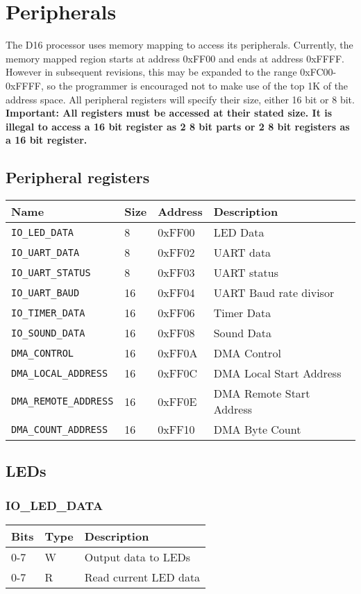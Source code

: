 \documentclass{article}
\newcommand{\regdesc}[2]{
  \subsubsection{#1}
  \begin{tabular}{|l|l|l|}
    \hline
    Bits & Type & Description \\ \hline
    #2
  \end{tabular}
}
\begin{document}
        \section{Peripherals}
        The D16 processor uses memory mapping to access its peripherals. Currently, the memory mapped region starts at address 0xFF00 and ends at address 0xFFFF. However in subsequent revisions, this may be expanded to the range 0xFC00-0xFFFF, so the programmer is encouraged not to make use of the top 1K of the address space.
        All peripheral registers will specify their size, either 16 bit or 8 bit. \textbf{Important: All registers must be accessed at their stated size. It is illegal to access a 16 bit register as 2 8 bit parts or 2 8 bit registers as a 16 bit register.}
        \subsection{Peripheral registers}
                \begin{tabular}{|l|l|l|l|}
        \hline
        Name & Size & Address & Description \\ \hline
        \verb|IO_LED_DATA| & 8 &0xFF00 & LED Data \\ \hline
        \verb|IO_UART_DATA| & 8 &0xFF02 & UART data \\ \hline
        \verb|IO_UART_STATUS| & 8 & 0xFF03 & UART status \\ \hline
        \verb|IO_UART_BAUD| & 16 & 0xFF04 & UART Baud rate divisor \\ \hline
        \verb|IO_TIMER_DATA| & 16 & 0xFF06 & Timer Data \\ \hline
        \verb|IO_SOUND_DATA| & 16 & 0xFF08 & Sound Data \\ \hline
        \verb|DMA_CONTROL| & 16 & 0xFF0A & DMA Control \\ \hline
        \verb|DMA_LOCAL_ADDRESS| & 16 & 0xFF0C & DMA Local Start Address \\ \hline
        \verb|DMA_REMOTE_ADDRESS| & 16 & 0xFF0E & DMA Remote Start Address \\ \hline
        \verb|DMA_COUNT_ADDRESS| & 16 & 0xFF10 & DMA Byte Count \\ \hline
        
        \end{tabular}


        \subsection{LEDs}
        \regdesc{IO\_LED\_DATA}{
          0-7 & W & Output data to LEDs \\ \hline
          0-7 & R & Read current LED data \\ \hline
        }
\end{document}
